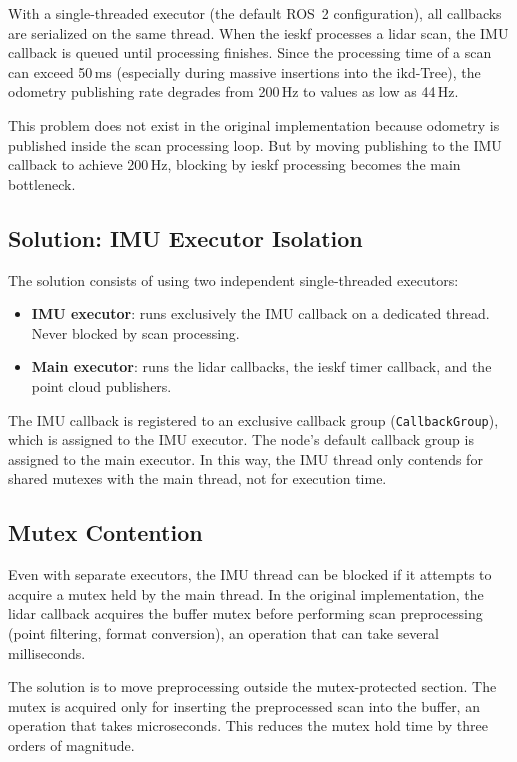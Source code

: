 With a single-threaded executor (the default ROS~2 configuration), all callbacks
are serialized on the same thread. When the \gls{ieskf} processes a \gls{lidar}
scan, the IMU callback is queued until processing finishes. Since the processing
time of a scan can exceed 50\,ms (especially during massive insertions into the
ikd-Tree), the odometry publishing rate degrades from 200\,Hz to values as low as
44\,Hz.

This problem does not exist in the original implementation because odometry is
published inside the scan processing loop. But by moving publishing to the IMU
callback to achieve 200\,Hz, blocking by \gls{ieskf} processing becomes the main
bottleneck.

\subsection{Solution: IMU Executor Isolation}
\label{sec:fr-isolation}

The solution consists of using two independent single-threaded executors:

\begin{itemize}
    \item \textbf{IMU executor}: runs exclusively the IMU callback on a dedicated
    thread. Never blocked by scan processing.
    \item \textbf{Main executor}: runs the \gls{lidar} callbacks, the \gls{ieskf}
    timer callback, and the point cloud publishers.
\end{itemize}

The IMU callback is registered to an exclusive callback group
(\texttt{CallbackGroup}), which is assigned to the IMU executor. The node's default
callback group is assigned to the main executor. In this way, the IMU thread only
contends for shared mutexes with the main thread, not for execution time.

\subsection{Mutex Contention}
\label{sec:fr-mutex}

Even with separate executors, the IMU thread can be blocked if it attempts to
acquire a mutex held by the main thread. In the original implementation, the
\gls{lidar} callback acquires the buffer mutex before performing scan
preprocessing (point filtering, format conversion), an operation that can take
several milliseconds.

The solution is to move preprocessing outside the mutex-protected section. The
mutex is acquired only for inserting the preprocessed scan into the buffer, an
operation that takes microseconds. This reduces the mutex hold time by three orders
of magnitude.

